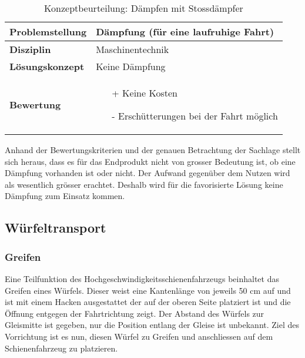 \documentclass[../../main.tex]{subfiles}
\begin{document}
\begin{flushleft}
    \begin{table}[h]
    \begin{tabular}{ | l | p{11cm} |}
    \hline
    \textbf{Problemstellung} & Dämpfung (für eine laufruhige Fahrt) \\ \hline
    \textbf{Disziplin} & Maschinentechnik \\ \hline
    \textbf{Lösungskonzept} & Keine Dämpfung \\ \hline
    \textbf{Bewertung} &  \begin{itemize}
                            \item[+] Keine Kosten
                            \item[-] Erschütterungen bei der Fahrt möglich
                          \end{itemize} \\ \hline
    \end{tabular}
    \caption{Konzeptbeurteilung: Dämpfen mit Stossdämpfer}
    \label{tab:konzept_fahrwerk_keinedaempfung}
\end{table}
\end{flushleft}

Anhand der Bewertungskriterien und der genauen Betrachtung der Sachlage stellt sich heraus, dass es für das Endprodukt nicht von grosser Bedeutung ist, ob eine Dämpfung vorhanden ist oder nicht. Der Aufwand gegenüber dem Nutzen wird als wesentlich grösser erachtet. Deshalb wird für die favorisierte Lösung keine Dämpfung zum Einsatz kommen.

\subsection{Würfeltransport}
\subsubsection{Greifen}
 Eine Teilfunktion des Hochgeschwindigkeitsschienenfahrzeugs beinhaltet das Greifen eines Würfels. Dieser weist eine Kantenlänge von jeweils 50 cm auf und ist mit einem Hacken ausgestattet der auf der oberen Seite platziert ist und die Öffnung entgegen der Fahrtrichtung zeigt. Der Abstand des Würfels zur Gleismitte ist gegeben, nur die Position entlang der Gleise ist unbekannt. Ziel des Vorrichtung ist es nun, diesen Würfel zu Greifen und anschliessen auf dem Schienenfahrzeug zu platzieren.\\
\end{document}
